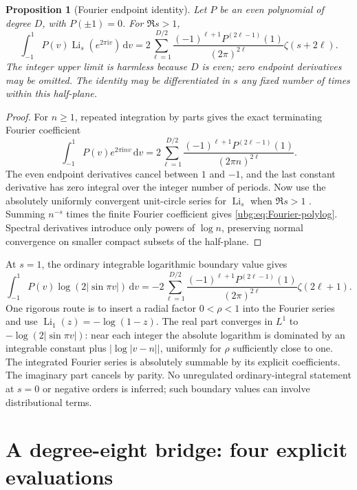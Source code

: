\documentclass[11pt,letterpaper]{article}
\numberwithin{equation}{section}
\newtheorem{proposition}[theorem]{Proposition}
\theoremstyle{definition}\newtheorem{definition}[theorem]{Definition}
\theoremstyle{remark}\newtheorem{remark}[theorem]{Remark}
\newcommand{\dd}{\,\mathrm d}\newcommand{\ii}{\mathrm i}
\DeclareMathOperator{\Li}{Li}\DeclareMathOperator{\FP}{FP}
\begin{document}
\begin{proposition}[Fourier endpoint identity]\label{ubg:prop:Fourier}
Let $P$ be an even polynomial of degree $D$, with $P(\pm1)=0$.
For $\Re s>1$,
\begin{equation}\label{ubg:eq:Fourier-polylog}
 \boxed{\displaystyle
 \int_{-1}^1P(v)\Li_s(e^{2\pi\ii v})\dd v
 =2\sum_{\ell=1}^{D/2}
      \frac{(-1)^{\ell+1}P^{(2\ell-1)}(1)}{(2\pi)^{2\ell}}
           \zeta(s+2\ell).}
\end{equation}
The integer upper limit is harmless because $D$ is even; zero
endpoint derivatives may be omitted. The identity may be differentiated
in $s$ any fixed number of times within this half-plane.
\end{proposition}
\begin{proof}
For $n\ge1$, repeated integration by parts gives the exact terminating
Fourier coefficient
\[
 \int_{-1}^1P(v)e^{2\pi\ii nv}\dd v
 =2\sum_{\ell=1}^{D/2}
       \frac{(-1)^{\ell+1}P^{(2\ell-1)}(1)}{(2\pi n)^{2\ell}}.
\]
The even endpoint derivatives cancel between $1$ and $-1$, and the
last constant derivative has zero integral over the integer number
of periods. Now use the absolutely uniformly convergent unit-circle
series for $\Li_s$ when $\Re s>1$ \cite{DLMFpolylog}. Summing $n^{-s}$
times the finite Fourier coefficient gives
\eqref{ubg:eq:Fourier-polylog}. Spectral derivatives introduce only
powers of $\log n$, preserving normal convergence on smaller compact
subsets of the half-plane.
\end{proof}

At $s=1$, the ordinary integrable logarithmic boundary value gives
\begin{equation}\label{ubg:eq:logsine-general}
 \int_{-1}^1P(v)\log(2|\sin\pi v|)\dd v
 =-2\sum_{\ell=1}^{D/2}
   \frac{(-1)^{\ell+1}P^{(2\ell-1)}(1)}{(2\pi)^{2\ell}}
                           \zeta(2\ell+1).
\end{equation}
One rigorous route is to insert a radial factor $0<\rho<1$ into the
Fourier series and use $\Li_1(z)=-\log(1-z)$.
The real part converges in $L^1$ to $-\log(2|\sin\pi v|)$:
near each integer the absolute logarithm is dominated by an integrable
constant plus $|\log|v-n||$, uniformly for $\rho$ sufficiently close
to one. The integrated Fourier series is absolutely summable by its
explicit coefficients. The imaginary part cancels by parity.
No unregulated ordinary-integral statement at $s=0$ or negative orders
is inferred; such boundary values can involve distributional terms.

\section{A degree-eight bridge: four explicit evaluations}
\label{ubg:sec:examples}
\end{document}
